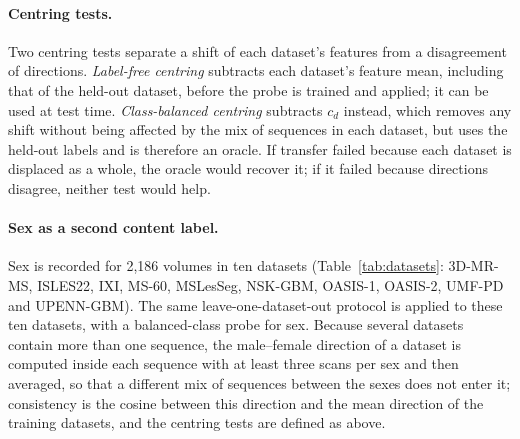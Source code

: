 \documentclass[11pt]{article}
\begin{document}
\paragraph{Centring tests.}
Two centring tests separate a shift of each dataset's features from a
disagreement of directions. \emph{Label-free centring} subtracts each
dataset's feature mean, including that of the held-out dataset, before the
probe is trained and applied; it can be used at test time. \emph{Class-balanced
centring} subtracts $c_d$ instead, which removes any shift without being
affected by the mix of sequences in each dataset, but uses the held-out labels
and is therefore an oracle. If transfer failed because each dataset is
displaced as a whole, the oracle would recover it; if it failed because
directions disagree, neither test would help.

\paragraph{Sex as a second content label.}
Sex is recorded for 2{,}186 volumes in ten datasets (Table~\ref{tab:datasets}:
3D-MR-MS, ISLES22, IXI, MS-60, MSLesSeg, NSK-GBM, OASIS-1, OASIS-2, UMF-PD and
UPENN-GBM). The same leave-one-dataset-out protocol is applied to these ten
datasets, with a balanced-class probe for sex. Because several datasets
contain more than one sequence, the male--female direction of a dataset is
computed inside each sequence with at least three scans per sex and then
averaged, so that a different mix of sequences between the sexes does not
enter it; consistency is the cosine between this direction and the mean
direction of the training datasets, and the centring tests are defined as
above.
\end{document}
